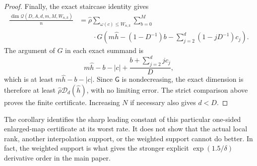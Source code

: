 \documentclass[11pt,letterpaper]{article}
\theoremstyle{definition}
\newcommand{\Qspace}{\mathcal{Q}}
\begin{document}
\begin{proof}
Finally, the exact staircase identity gives
\begin{align*}
  \frac{\dim\Qspace(D,A,d,m,M,W_{n,k})}{n}
  &=\widehat \rho
  \sum_{\omega(c)\leq W_{n,k}}\sum_{b=0}^{M}
  \\
  &\qquad{}\cdot
  G\left(
    m\widehat h-(1-D^{-1})b
    -\sum_{j=2}^{d}(1-jD^{-1})c_j
  \right).
\end{align*}
The argument of \(G\) in each exact summand is
\[
  m\widehat h-b-|c|
  +\frac{b+\sum_{j=2}^djc_j}{D},
\]
which is at least \(m\widehat h-b-|c|\). Since \(\mathsf G\) is nondecreasing, the
exact dimension is therefore at least
\(\widehat \rho \mathscr D_d(\widehat h)\), with no limiting error. The strict
comparison above proves the finite certificate. Increasing \(N\) if
necessary also gives \(d<D\).
\end{proof}

The corollary identifies the sharp leading constant of this particular
one-sided enlarged-map certificate at its worst rate. It does not show that
the actual local rank, another interpolation support, or the weighted support
cannot do better. In fact, the weighted support is what gives the stronger
explicit $\exp(1.5/\delta)$ derivative order in the main paper.
 
\end{document}
